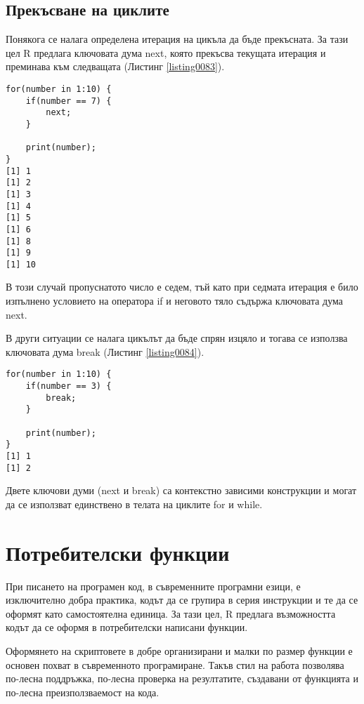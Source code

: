 \subsection{Прекъсване на циклите}

Понякога се налага определена итерация на цикъла да бъде прекъсната. За тази цел R предлага ключовата дума next, която прекъсва текущата итерация и преминава към следващата (Листинг \ref{listing0083}).

\begin{lstlisting}[caption=Прекъсване на итерация, label=listing0083]
for(number in 1:10) { 
	if(number == 7) {
		next;
	}

	print(number);
}
[1] 1
[1] 2
[1] 3
[1] 4
[1] 5
[1] 6
[1] 8
[1] 9
[1] 10
\end{lstlisting}

В този случай пропуснатото число е седем, тъй като при седмата итерация е било изпълнено условието на оператора if и неговото тяло съдържа ключовата дума next.

В други ситуации се налага цикълът да бъде спрян изцяло и тогава се използва ключовата дума break (Листинг \ref{listing0084}).

\begin{lstlisting}[caption=Прекъсване на цикъла, label=listing0084]
for(number in 1:10) { 
	if(number == 3) {
		break;
	}

	print(number);
}
[1] 1
[1] 2
\end{lstlisting}

Двете ключови думи (next и break) са контекстно зависими конструкции и могат да се използват единствено в телата на циклите for и while.

\section{Потребителски функции}

При писането на програмен код, в съвременните програмни езици, е изключително добра практика, кодът да се групира в серия инструкции и те да се оформят като самостоятелна единица. За тази цел, R предлага възможността кодът да се оформя в потребителски написани функции.

Оформянето на скриптовете в добре организирани и малки по размер функции е основен похват в съвременното програмиране. Такъв стил на работа позволява по-лесна поддръжка, по-лесна проверка на резултатите, създавани от функцията и по-лесна преизползваемост на кода.

